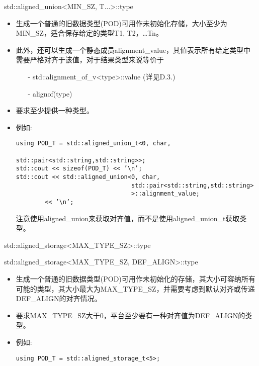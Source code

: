 std::aligned\_union<MIN\_SZ, T...>::type

\begin{itemize}
\item
生成一个普通的旧数据类型(POD)可用作未初始化存储，大小至少为MIN\_SZ，适合保存给定的类型T1, T2，…Tn。

\item
此外，还可以生成一个静态成员alignment\_value，其值表示所有给定类型中需要严格对齐于该值，对于结果类型来说等价于

\begin{itemize}
\item[-]
std::alignment\_of\_v<type>::value (详见D.3.)

\item[-]
alignof(type)
\end{itemize}

\item
要求至少提供一种类型。

\item
例如:
\begin{lstlisting}[style=styleCXX]
using POD_T = std::aligned_union_t<0, char,
								std::pair<std::string,std::string>>;
std::cout << sizeof(POD_T) << ’\n’;
std::cout << std::aligned_union<0, char,
								std::pair<std::string,std::string>
								>::alignment_value;
		<< ’\n’;
\end{lstlisting}

注意使用aligned\_union来获取对齐值，而不是使用aligned\_union\_t获取类型。
\end{itemize}

std::aligned\_storage<MAX\_TYPE\_SZ>::type

std::aligned\_storage<MAX\_TYPE\_SZ, DEF\_ALIGN>::type

\begin{itemize}
\item
生成一个普通的旧数据类型(POD)可用作未初始化的存储，其大小可容纳所有可能的类型，其大小最大为MAX\_TYPE\_SZ，并需要考虑到默认对齐或传递DEF\_ALIGN的对齐情况。

\item
要求MAX\_TYPE\_SZ大于0，平台至少要有一种对齐值为DEF\_ALIGN的类型。

\item
例如:
\begin{lstlisting}[style=styleCXX]
using POD_T = std::aligned_storage_t<5>;
\end{lstlisting}
\end{itemize}













